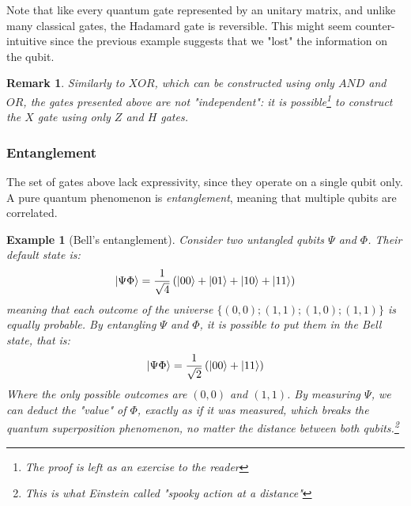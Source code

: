 \documentclass[12pt,a4paper]{article}
\theoremstyle{plain}
\newtheorem*{example}{Example}
\newtheorem*{remark}{Remark}
\theoremstyle{definition}
\DeclarePairedDelimiter\ket{\lvert}{\rangle}
\begin{document}
Note that like every quantum gate represented by an unitary matrix, and unlike many classical gates, the Hadamard gate is reversible. This might seem counter-intuitive since the previous example suggests that we "lost" the information on the qubit. 

\begin{remark}
    Similarly to $XOR$, which can be constructed using only $AND$ and $OR$, the gates presented above are not "independent": it is possible\footnote{The proof is left as an exercise to the reader} to construct the $X$ gate using only $Z$ and $H$ gates.
\end{remark}

\subsubsection{Entanglement}
The set of gates above lack expressivity, since they operate on a single qubit only. A pure quantum phenomenon is \emph{entanglement}, meaning that multiple qubits are correlated.

\begin{example}[Bell's entanglement]
    Consider two untangled qubits $\Psi$ and $\Phi$. Their default state is:
    \begin{equation*}
        \ket{\Psi\Phi} = \frac{1}{\sqrt{4}} \left(\ket{00}+\ket{01}+\ket{10}+\ket{11}\right)
    \end{equation*}
    meaning that each outcome of the universe $\{(0,0); (1,1); (1,0); (1,1)\}$ is equally probable. By entangling $\Psi$ and $\Phi$, it is possible to put them in the \emph{Bell state}, that is: 
    \begin{equation*}
        \ket{\Psi\Phi} = \frac{1}{\sqrt{2}} \left(\ket{00}+\ket{11}\right)
    \end{equation*}
    Where the only possible outcomes are $(0, 0)$ and $(1, 1)$. By measuring $\Psi$, we can deduct the "value" of $\Phi$, exactly as if it was measured, which breaks the quantum superposition phenomenon, no matter the distance between both qubits.\footnote{This is what Einstein called "spooky action at a distance"}
\end{example}
\end{document}
